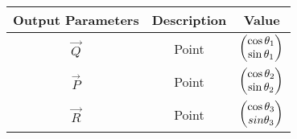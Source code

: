 \begin{tabular}{|c|c|c|}
    \hline
        \textbf{Output Parameters} &\textbf{Description} &\textbf{Value} \\
\hline
          $\vec{Q}$ & Point &$\begin{pmatrix}\cos{\theta_1}\\\sin{\theta_1}\end{pmatrix}$\\
          \hline
          $\vec{P}$ & Point &$\begin{pmatrix}\cos{\theta_2}\\\sin{\theta_2}\end{pmatrix}$ \\
         \hline
          $\vec{R}$ & Point &$\begin{pmatrix}\cos{\theta_3}\\sin{\theta_3}\end{pmatrix}$ \\
         \hline
    \end{tabular}

